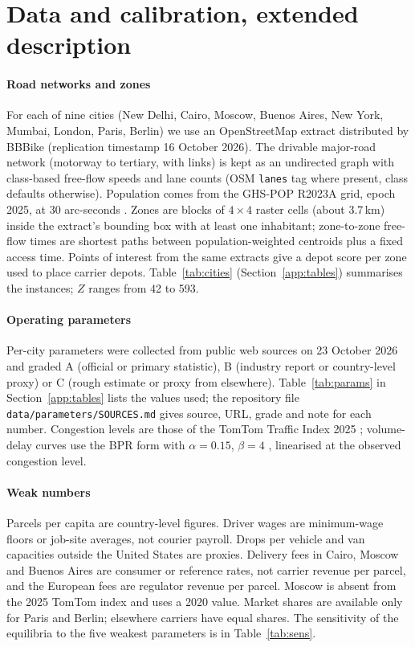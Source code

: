 \documentclass[preprint,11pt]{elsarticle}
\theoremstyle{definition}
\theoremstyle{remark}
\begin{document}
\section{Data and calibration, extended description}\label{sec:data}

\paragraph{Road networks and zones} For each of nine cities (New Delhi, Cairo, Moscow, Buenos Aires, New York, Mumbai, London, Paris, Berlin) we use an OpenStreetMap extract \citep{Haklay2008} distributed by BBBike (replication timestamp 16 October 2026). The drivable major-road network (motorway to tertiary, with links) is kept as an undirected graph with class-based free-flow speeds and lane counts (OSM \texttt{lanes} tag where present, class defaults otherwise). Population comes from the GHS-POP R2023A grid, epoch 2025, at 30 arc-seconds \citep{GHSPOP2023}. Zones are blocks of $4\times4$ raster cells (about 3.7\,km) inside the extract's bounding box with at least one inhabitant; zone-to-zone free-flow times are shortest paths between population-weighted centroids plus a fixed access time. Points of interest from the same extracts give a depot score per zone used to place carrier depots. Table~\ref{tab:cities} (Section~\ref{app:tables}) summarises the instances; $Z$ ranges from 42 to 593.

\paragraph{Operating parameters} Per-city parameters were collected from public web sources on 23 October 2026 and graded A (official or primary statistic), B (industry report or country-level proxy) or C (rough estimate or proxy from elsewhere). Table~\ref{tab:params} in Section~\ref{app:tables} lists the values used; the repository file \texttt{data/parameters/SOURCES.md} gives source, URL, grade and note for each number. Congestion levels are those of the TomTom Traffic Index 2025 \citep{TomTom2025}; volume-delay curves use the BPR form with $\alpha=0.15$, $\beta=4$ \citep{BPR1964}, linearised at the observed congestion level.

\paragraph{Weak numbers} Parcels per capita are country-level figures. Driver wages are minimum-wage floors or job-site averages, not courier payroll. Drops per vehicle and van capacities outside the United States are proxies. Delivery fees in Cairo, Moscow and Buenos Aires are consumer or reference rates, not carrier revenue per parcel, and the European fees are regulator revenue per parcel. Moscow is absent from the 2025 TomTom index and uses a 2020 value. Market shares are available only for Paris and Berlin; elsewhere carriers have equal shares. The sensitivity of the equilibria to the five weakest parameters is in Table~\ref{tab:sens}.
\end{document}
